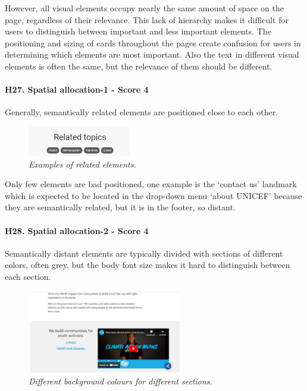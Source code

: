 \newline However, all visual elements occupy nearly the same amount of space on the page, regardless of their relevance. This lack of hierarchy makes it difficult for users to distinguish between important and less important elements. 
\newline The positioning and sizing of cards throughout the pages create confusion for users in determining which elements are most important.
\newline Also the text in different visual elements is often the same, but the relevance of them should be different.
\newline
\newline \paragraph{H27. Spatial allocation-1 - Score 4} \label{subsec:H27}	Generally, semantically related elements are positioned close to each other.
\begin{figure}[!h]
	\begin{center}
		\includegraphics[width=0.4\textwidth]{FinalScores30.jpg}
		\captionsetup{font=small}
		\caption{\textit{Examples of related elements.}}
	\end{center}
\end{figure}
\newline Only few elements are bad positioned, one example is the ‘contact us’ landmark which is expected to be located in the drop-down menu ‘about UNICEF’ because they are semantically related, but it is in the footer, so distant.
\newline
\newline \paragraph{H28. Spatial allocation-2 - Score 4} \label{subsec:H28}	Semantically distant elements are typically divided with sections of different colors, often grey, but the body font size makes it hard to distinguish between each section. 
\begin{figure}[!h]
	\begin{center}
		\includegraphics[width=0.6\textwidth]{FinalScores31.jpg}
		\captionsetup{font=small}
		\caption{\textit{Different background colours for different sections.}}
	\end{center}
\end{figure}
